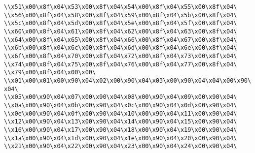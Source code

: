 \verb|\\x51\x00\x8f\x04\x53\x00\x8f\x04\x54\x00\x8f\x04\x55\x00\x8f\x04\|\newline
\verb|\\x56\x00\x8f\x04\x58\x00\x8f\x04\x59\x00\x8f\x04\x5b\x00\x8f\x04\|\newline
\verb|\\x5c\x00\x8f\x04\x5d\x00\x8f\x04\x5e\x00\x8f\x04\x5f\x00\x8f\x04\|\newline
\verb|\\x60\x00\x8f\x04\x61\x00\x8f\x04\x62\x00\x8f\x04\x63\x00\x8f\x04\|\newline
\verb|\\x64\x00\x8f\x04\x65\x00\x8f\x04\x66\x00\x8f\x04\x67\x00\x8f\x04\|\newline
\verb|\\x6b\x00\x8f\x04\x6c\x00\x8f\x04\x6d\x00\x8f\x04\x6e\x00\x8f\x04\|\newline
\verb|\\x6f\x00\x8f\x04\x70\x00\x8f\x04\x72\x00\x8f\x04\x73\x00\x8f\x04\|\newline
\verb|\\x74\x00\x8f\x04\x75\x00\x8f\x04\x76\x00\x8f\x04\x77\x00\x8f\x04\|\newline
\verb|\\x79\x00\x8f\x04\x00\x00\|\newline
\verb|\\x01\x00\x01\x00\x90\x04\x02\x00\x90\x04\x03\x00\x90\x04\x04\x00\x90\x04\|\newline
\verb|\\x05\x00\x90\x04\x07\x00\x90\x04\x08\x00\x90\x04\x09\x00\x90\x04\|\newline
\verb|\\x0a\x00\x90\x04\x0b\x00\x90\x04\x0c\x00\x90\x04\x0d\x00\x90\x04\|\newline
\verb|\\x0e\x00\x90\x04\x0f\x00\x90\x04\x10\x00\x90\x04\x11\x00\x90\x04\|\newline
\verb|\\x12\x00\x90\x04\x13\x00\x90\x04\x14\x00\x90\x04\x15\x00\x90\x04\|\newline
\verb|\\x16\x00\x90\x04\x17\x00\x90\x04\x18\x00\x90\x04\x19\x00\x90\x04\|\newline
\verb|\\x1a\x00\x90\x04\x1d\x00\x90\x04\x1e\x00\x90\x04\x20\x00\x90\x04\|\newline
\verb|\\x21\x00\x90\x04\x22\x00\x90\x04\x23\x00\x90\x04\x24\x00\x90\x04\|\newline
